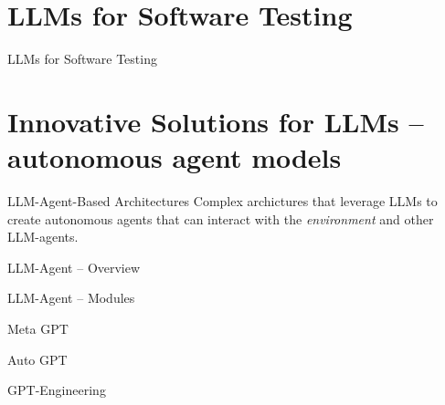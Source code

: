 \documentclass[presentation, 10pt]{beamer}\mode<presentation>{\usetheme{AMSBolognaFC}}
\begin{document}
\section{LLMs for Software Testing}

\begin{frame}{LLMs for Software Testing}

\end{frame}
\section{Innovative Solutions for LLMs -- autonomous agent models}
\begin{frame}[plain]
\centering
\huge{LLM-Agent-Based Architectures}
\large{ 
Complex archictures that leverage LLMs to create autonomous agents that can interact with the \emph{environment} and other LLM-agents.
}
\end{frame}
\begin{frame}{LLM-Agent -- Overview}

\end{frame}
\begin{frame}{LLM-Agent -- Modules}

\end{frame}
\begin{frame}{Meta GPT}

\end{frame}
\begin{frame}{Auto GPT}

\end{frame}
\begin{frame}{GPT-Engineering}

\end{frame}

\frame{\titlepage}

\section*{\refname}

\begin{frame}{\refname}
	\tiny
	\printbibliography
\end{frame}

\end{document}
